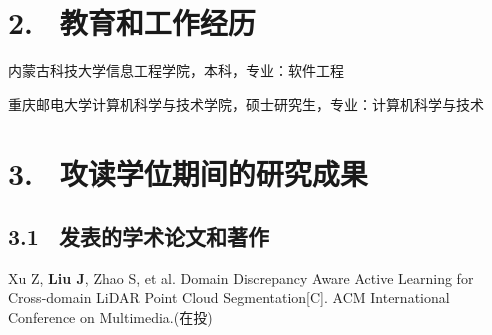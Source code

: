 \section{2. \ 教育和工作经历}
\vspace{-0.1cm}
\begin{description}[leftmargin=3.5cm, style=sameline]
\item[2017.09$\sim$2021.07] 内蒙古科技大学信息工程学院，本科，专业：软件工程
\item[2022.09$\sim$2025.06] 重庆邮电大学计算机科学与技术学院，硕士研究生，专业：计算机科学与技术
\end{description}

\section{3. \ 攻读学位期间的研究成果}
\vspace{-0.1cm}
\subsection{3.1 \ 发表的学术论文和著作}
\noindent [1]
\begin{minipage}[t]{0.96\linewidth}
Xu Z, \textbf{Liu J}, Zhao S, et al. Domain Discrepancy Aware Active Learning for Cross-domain LiDAR Point Cloud Segmentation[C]. ACM International Conference on Multimedia.(在投)
\end{minipage}

